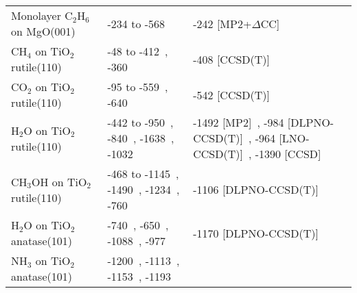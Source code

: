 \begin{table}
\begin{adjustbox}{center,max width=0.85\textwidth}
\begin{tabular}{lp{7cm}p{7cm}}
Monolayer C$_2$H$_6$ on MgO(001) & -234 to -568~\cite{r.rehakIncludingDispersionDensity2020} & -242 [MP2+$\Delta$CC]~\cite{alessioChemicallyAccurateAdsorption2018} \\
CH$_4$ on TiO$_2$ rutile(110) & -48 to -412~\cite{kubasSurfaceAdsorptionEnergetics2016c}, -360~\cite{tillotsonAdsorptionOrganicMolecules2015} & -408 [CCSD(T)]~\cite{kubasSurfaceAdsorptionEnergetics2016c} \\
CO$_2$ on TiO$_2$ rutile(110) & -95 to -559~\cite{kubasSurfaceAdsorptionEnergetics2016c}, -640~\cite{kovacicElectronicPropertiesRutile2022} & -542 [CCSD(T)]~\cite{kubasSurfaceAdsorptionEnergetics2016c} \\
H$_2$O on TiO$_2$ rutile(110) & -442 to -950~\cite{kubasSurfaceAdsorptionEnergetics2016c}, -840~\cite{liuStructureDynamicsLiquid2010b}, -1638~\cite{banduraAdsorptionWaterTiO22004a}, -1032~\cite{sorescuCoadsorptionPropertiesCO22012} & -1492 [MP2]~\cite{stefanovichInitioStudyWater1999}, -984 [DLPNO-CCSD(T)]~\cite{kubasSurfaceAdsorptionEnergetics2016c}, -964 [LNO-CCSD(T)]~\cite{yeInitioSurfaceChemistry2024}, -1390 [CCSD]~\cite{schaferLocalEmbeddingCoupled2021b} \\
CH$_3$OH on TiO$_2$ rutile(110) & -468 to -1145~\cite{kubasSurfaceAdsorptionEnergetics2016c}, -1490~\cite{kieuTrendsAdsorptionEnergy2002}, -1234~\cite{batesAdsorptionDissociationROH1998}, -760~\cite{langFirstPrinciplesStudyMethanol2014} & -1106 [DLPNO-CCSD(T)]~\cite{kubasSurfaceAdsorptionEnergetics2016c} \\
H$_2$O on TiO$_2$ anatase(101) & -740~\cite{vittadiniStructureEnergeticsWater1998}, -650~\cite{millerEffectsWaterFormic2011}, -1088~\cite{onalAdsorptionWaterAmmonia2006}, -977~\cite{zhaoStructurePropertiesWater2012} & -1170 [DLPNO-CCSD(T)]~\cite{petersenWaterAdsorptionIdeal2020} \\
NH$_3$ on TiO$_2$ anatase(101) & -1200~\cite{koustNH3AdsorptionAnataseTiO21012018}, -1113~\cite{onalAdsorptionWaterAmmonia2006}, -1153~\cite{wanbayorAdsorptionCOH22010}, -1193~\cite{changAdsorptionConfigurationDissociative2009} &  \\
\bottomrule
\end{tabular}
\end{adjustbox}

\end{table}